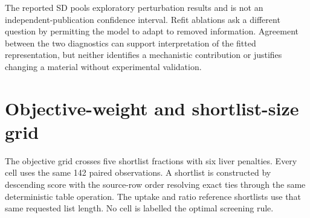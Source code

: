 \documentclass[11pt]{article}
\begin{document}
The reported SD pools exploratory perturbation results and is not an independent-publication confidence interval. Refit ablations ask a different question by permitting the model to adapt to removed information. Agreement between the two diagnostics can support interpretation of the fitted representation, but neither identifies a mechanistic contribution or justifies changing a material without experimental validation.

\section{Objective-weight and shortlist-size grid}
The objective grid crosses five shortlist fractions with six liver penalties. Every cell uses the same 142 paired observations. A shortlist is constructed by descending score with the source-row order resolving exact ties through the same deterministic table operation. The uptake and ratio reference shortlists use that same requested list length. No cell is labelled the optimal screening rule.
\end{document}
